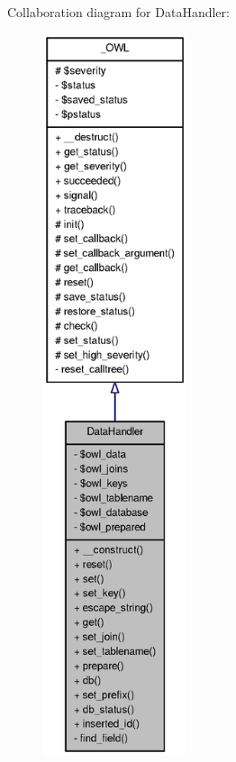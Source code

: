 Collaboration diagram for DataHandler:\nopagebreak
\begin{figure}[H]
\begin{center}
\leavevmode
\includegraphics[height=600pt]{classDataHandler__coll__graph}
\end{center}
\end{figure}
